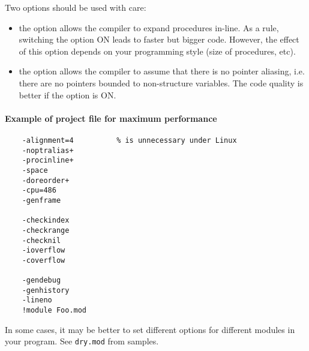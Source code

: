 Two options should be used with care:
\begin{itemize}
\item the  option allows the compiler to expand
      procedures in-line. As a rule, switching the option ON leads
      to faster but bigger code.
      However, the effect of this option depends on your
      programming style (size of procedures, etc).
\item the  option allows
      the compiler to assume that there is no
      pointer aliasing, i.e. there are no pointers bounded to
      non-structure variables.
      The code quality is better if the option is ON.
\end{itemize}

\paragraph{Example of project file for maximum performance}
\begin{verbatim}
    -alignment=4          % is unnecessary under Linux
    -noptralias+
    -procinline+
    -space
    -doreorder+
    -cpu=486
    -genframe

    -checkindex
    -checkrange
    -checknil
    -ioverflow
    -coverflow

    -gendebug
    -genhistory
    -lineno
    !module Foo.mod
\end{verbatim}
In some cases, it may be better to set different options for
different modules in your program. See {\tt dry.mod} from \XDS{}
samples.

\fi %
